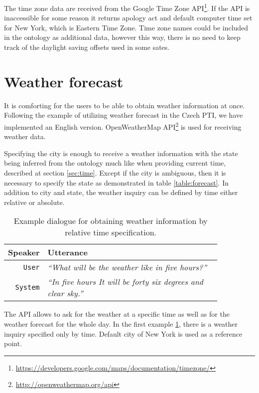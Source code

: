 The time zone data are received from the Google Time Zone API\footnote{\url{https://developers.google.com/maps/documentation/timezone/}}.
If the API is inaccessible for some reason it returns apology act and default computer time set for New York, which is Eastern Time Zone.
Time zone names could be included in the ontology as additional data, however this way, there is no need to keep track of the daylight saving offsets used in some sates.

\section{Weather forecast}

It is comforting for the users to be able to obtain weather information at once.
Following the example of utilizing weather forecast in the Czech PTI, we have implemented an English version.
OpenWeatherMap API\footnote{\url{http://openweathermap.org/api}} is used for receiving weather data.

Specifying the city is enough to receive a weather information with the state being inferred from the ontology much like when providing current time, described at section \ref{sec:time}.
Except if the city is ambiguous, then it is necessary to specify the state as demonstrated in table \ref{table:forecast}.
In addition to city and state, the weather inquiry can be defined by time either relative or absolute.

\begin{table}[h]
\centering
\begin{tabular}{ | r | p{0.85\linewidth} | } \hline
	\textbf{Speaker} & \textbf{Utterance} \\ \hline
	\texttt{User} & \textit{``What will be the weather like in five hours?''} \\ \hline
	\texttt{System} & \textit{``In five hours It will be forty six degrees and clear sky.''} \\ \hline
\end{tabular}
\caption[Weather inquiry by relative time]{Example dialogue for obtaining weather information by relative time specification.}
\label{table:weather}
\end{table}

The API allows to ask for the weather at a specific time as well as for the weather forecast for the whole day.
In the first example \ref{table:weather}, there is a weather inquiry specified only by time.
Default city of New York is used as a reference point.

